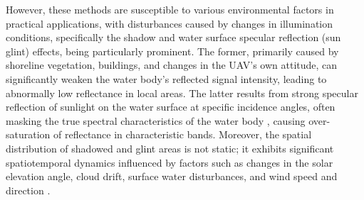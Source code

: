 \documentclass[final,3p,times,numbers]{elsarticle}
\begin{document}
However, these methods are susceptible to various environmental factors in practical applications, with disturbances caused by changes in illumination conditions, specifically the shadow and water surface specular reflection (sun glint) effects, being particularly prominent. The former, primarily caused by shoreline vegetation, buildings, and changes in the UAV's own attitude, can significantly weaken the water body's reflected signal intensity, leading to abnormally low reflectance in local areas. The latter results from strong specular reflection of sunlight on the water surface at specific incidence angles, often masking the true spectral characteristics of the water body \cite{ref:26,ref:27,ref:28,ref:29,ref:30}, causing over-saturation of reflectance in characteristic bands. Moreover, the spatial distribution of shadowed and glint areas is not static; it exhibits significant spatiotemporal dynamics influenced by factors such as changes in the solar elevation angle, cloud drift, surface water disturbances, and wind speed and direction \cite{ref:31,ref:32,ref:33}.
\end{document}
